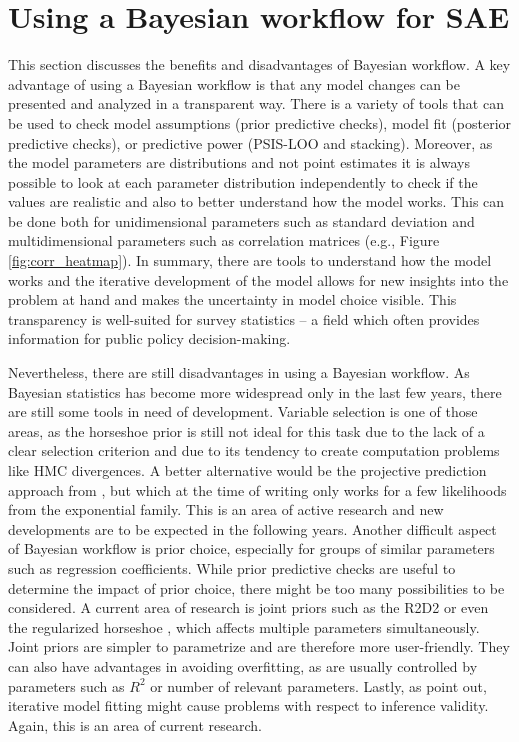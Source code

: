\section{Using a Bayesian workflow for SAE}

This section discusses the benefits and disadvantages of Bayesian workflow.
A key advantage of using a Bayesian workflow is that any model changes can be presented and analyzed in a transparent way.
There is a variety of tools that can be used to check model assumptions (prior predictive checks), model fit (posterior predictive checks), or predictive power (PSIS-LOO and stacking).
Moreover, as the model parameters are distributions and not point estimates it is always possible to look at each parameter distribution independently to check if the values are realistic and also to better understand how the model works.
This can be done both for unidimensional parameters such as standard deviation and multidimensional parameters such as correlation matrices (e.g., Figure \ref{fig:corr_heatmap}).
In summary, there are tools to understand how the model works and the iterative development of the model allows for new insights into the problem at hand and makes the uncertainty in model choice visible.
This transparency is well-suited for survey statistics – a field which often provides information for public policy decision-making.

Nevertheless, there are still disadvantages in using a Bayesian workflow.
As Bayesian statistics has become more widespread only in the last few years, there are still some tools in need of development.
Variable selection is one of those areas, as the horseshoe prior is still not ideal for this task due to the lack of a clear selection criterion and due to its tendency to create computation problems like HMC divergences.
A better alternative would be the projective prediction approach from \cite{piironen_projective_2020}, but which at the time of writing only works for a few likelihoods from the exponential family.
This is an area of active research and new developments are to be expected in the following years.
Another difficult aspect of Bayesian workflow is prior choice, especially for groups of similar parameters such as regression coefficients.
While prior predictive checks are useful to determine the impact of prior choice, there might be too many possibilities to be considered.
A current area of research is joint priors such as the R2D2 \citep{zhang_bayesian_2020} or even the regularized horseshoe \citep{piironen_sparsity_2017}, which affects multiple parameters simultaneously.
Joint priors are simpler to parametrize and are therefore more user-friendly.
They can also have advantages in avoiding overfitting, as are usually controlled by parameters such as $R^2$ or number of relevant parameters.
Lastly, as \cite{gelman_bayesian_2020} point out, iterative model fitting might cause problems with respect to inference validity.
Again, this is an area of current research.

